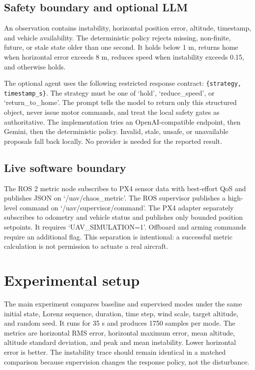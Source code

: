 \documentclass[11pt,a4paper,twocolumn]{article}
\begin{document}
\subsection{Safety boundary and optional LLM}
An observation contains instability, horizontal position error, altitude,
timestamp, and vehicle availability. The deterministic policy rejects missing,
non-finite, future, or stale state older than one second. It holds below 1 m,
returns home when horizontal error exceeds 8 m, reduces speed when instability
exceeds 0.15, and otherwise holds.

The optional agent uses the following restricted response contract:
\texttt{\{strategy, timestamp\_s\}}. The strategy must be one of `hold',
`reduce\_speed', or `return\_to\_home'. The prompt tells the model to return
only this structured object, never issue motor commands, and treat the local
safety gates as authoritative. The implementation tries an OpenAI-compatible
endpoint, then Gemini, then the deterministic policy. Invalid, stale, unsafe,
or unavailable proposals fall back locally. No provider is needed for the
reported result.

\subsection{Live software boundary}
The ROS 2 metric node subscribes to PX4 sensor data with best-effort QoS and
publishes JSON on `/uav/chaos\_metric'. The ROS supervisor publishes a high-level
command on `/uav/supervisor/command'. The PX4 adapter separately subscribes to
odometry and vehicle status and publishes only bounded position setpoints. It
requires `UAV\_SIMULATION=1'. Offboard and arming commands require an additional
flag. This separation is intentional: a successful metric calculation is not
permission to actuate a real aircraft.

\section{Experimental setup}
The main experiment compares baseline and supervised modes under the same
initial state, Lorenz sequence, duration, time step, wind scale, target
altitude, and random seed. It runs for 35 s and produces 1750 samples per mode.
The metrics are horizontal RMS error, horizontal maximum error, mean altitude,
altitude standard deviation, and peak and mean instability. Lower horizontal
error is better. The instability trace should remain identical in a matched
comparison because supervision changes the response policy, not the disturbance.
\end{document}
